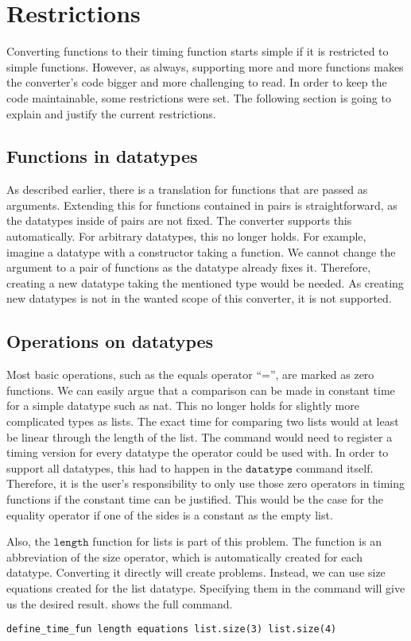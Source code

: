 
\section{Restrictions} \label{chapter:restrictions}

Converting functions to their timing function starts simple if it is restricted to simple functions.
However, as always, supporting more and more functions makes the converter's code bigger and more challenging to read.
In order to keep the code maintainable, some restrictions were set.
The following section is going to explain and justify the current restrictions.

\subsection{Functions in datatypes}
As described earlier, there is a translation for functions that are passed as arguments.
Extending this for functions contained in pairs is straightforward, as the datatypes inside of pairs are not fixed.
The converter supports this automatically.
For arbitrary datatypes, this no longer holds.
For example, imagine a datatype with a constructor taking a function.
We cannot change the argument to a pair of functions as the datatype already fixes it.
Therefore, creating a new datatype taking the mentioned type would be needed.
As creating new datatypes is not in the wanted scope of this converter, it is not supported.

\subsection{Operations on datatypes} \label{chapter:nonconstant_zeros}
Most basic operations, such as the equals operator ``='', are marked as zero functions.
We can easily argue that a comparison can be made in constant time for a simple datatype such as nat.
This no longer holds for slightly more complicated types as lists.
The exact time for comparing two lists would at least be linear through the length of the list.
The command would need to register a timing version for every datatype the operator could be used with.
In order to support all datatypes, this had to happen in the $\texttt{datatype}$ command itself.
Therefore, it is the user's responsibility to only use those zero operators in timing functions if the constant time can be justified.
This would be the case for the equality operator if one of the sides is a constant as the empty list.

Also, the $\texttt{length}$ function for lists is part of this problem.
The function is an abbreviation of the size operator, which is automatically created for each datatype.
Converting it directly will create problems.
Instead, we can use size equations created for the list datatype.
Specifying them in the command will give us the desired result.
 shows the full command.
\begin{lstlisting}[language=isabelle,float,label=lst:restr_length,caption=Converting the length function correctly]
  define_time_fun length equations list.size(3) list.size(4)
\end{lstlisting}

